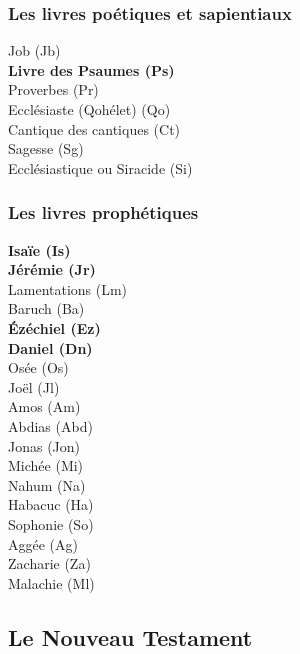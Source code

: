 \documentclass [11pt]{article}
\begin{document}
		\clearpage %
		
		\subsubsection*{Les livres poétiques et sapientiaux}
		
		\begin{multicols}{2}	
			\noindent Job (Jb)\\
			\textbf{Livre des Psaumes (Ps)}\\
			Proverbes (Pr)\\
			Ecclésiaste (Qohélet) (Qo)\\
			Cantique des cantiques (Ct)\\
			Sagesse (Sg)\\
			Ecclésiastique ou Siracide (Si)
		\end{multicols}
		
		\subsubsection*{Les livres prophétiques}
			\begin{multicols}{2}
				\noindent \textbf{Isaïe (Is)}\\
				\textbf{Jérémie (Jr)}\\
				Lamentations (Lm)\\
				Baruch (Ba)\\
				\textbf{Ézéchiel (Ez)}\\
				\textbf{Daniel (Dn)}\\
				Osée (Os)\\
				Joël (Jl)\\
				Amos (Am)\\
				Abdias (Abd)\\
				Jonas (Jon)\\
				Michée (Mi)\\
				Nahum (Na)\\
				Habacuc (Ha)\\
				Sophonie (So)\\
				Aggée (Ag)\\
				Zacharie (Za)\\
				Malachie (Ml)
			\end{multicols}
		
	
	\subsection*{Le Nouveau Testament}
			
\end{document}
